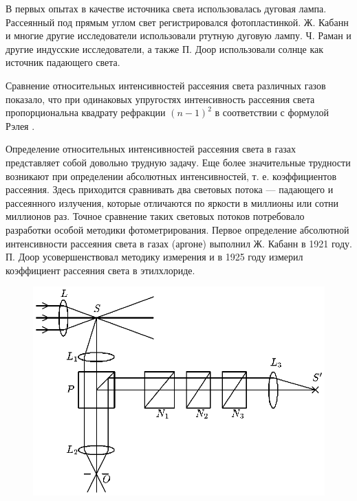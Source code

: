В первых опытах в качестве источника света использовалась дуговая
лампа. Рассеянный под прямым углом свет регистрировался
фотопластинкой. Ж. Кабанн и многие другие исследователи
использовали ртутную дуговую лампу. Ч. Раман и другие индусские
исследователи, а также П. Доор использовали солнце как источник
падающего света.

Сравнение относительных интенсивностей рассеяния света различных
газов показало, что при одинаковых упругостях интенсивность
рассеяния света пропорциональна квадрату рефракции $(n-1)^2$ в
соответствии с формулой Рэлея .

Определение относительных интенсивностей рассеяния света в газах
представляет собой довольно трудную задачу. Еще более
значительные трудности возникают при определении абсолютных
интенсивностей, т. е. коэффициентов рассеяния. Здесь приходится
сравнивать два световых потока --- падающего и рассеянного
излучения, которые отличаются по яркости в миллионы или сотни
миллионов раз. Точное сравнение таких световых потоков потребовало
разработки особой методики фотометрирования. Первое определение
абсолютной интенсивности рассеяния света в газах (аргоне)
выполнил Ж. Кабанн в 1921 году. П. Доор усовершенствовал
методику измерения и в 1925 году измерил коэффициент рассеяния
света в этилхлориде.

\begin{figure}[tbp]
\centerline{\hbox{\includegraphics[scale=0.9]{Ris/ris_eps/ris4_1_14.eps}}}

\end{figure}

